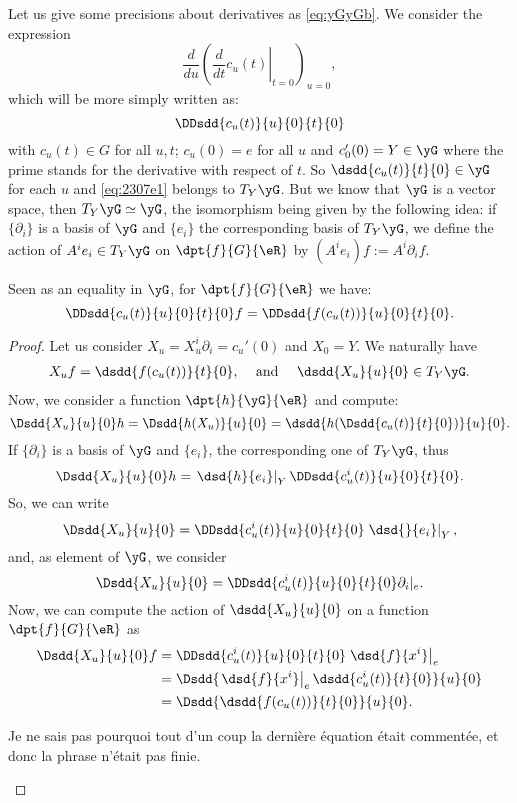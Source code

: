 Let us give some precisions about derivatives as \eqref{eq:yGyGb}. We consider the expression
\[
	\frac{d}{du}\left( \left.\frac{d}{dt} c_u(t)\right|_{t=0}\right)_{u=0},
\]
which will be more simply written as:
\begin{equation}\label{eq:2307e1}
	\DDsdd{ c_u(t) }{u}{0}{t}{0}
\end{equation}
with $c_u(t)\in G$ for all $u,t$; $c_u(0)=e$ for all $u$ and $c_0'(0)=Y\in\yG$ where the prime stands for the derivative with respect of $t$. So $\dsdd{c_u(t)}{t}{0}\in\yG$ for each $u$ and \eqref{eq:2307e1} belongs to $T_Y\yG$. But we know that $\yG$ is a vector space, then $T_Y\yG\simeq\yG$, the isomorphism being given by the following idea: if $\{\partial_i\}$ is a basis of $\yG$ and $\{e_i\}$ the corresponding basis of $T_Y\yG$, we define the action of $A^ie_i\in T_Y\yG$ on $\dpt{f}{G}{\eR}$ by $(A^ie_i)f:=A^i\partial_if$.

\begin{lemma}
	Seen as an equality in $\yG$, for $\dpt{f}{G}{\eR}$ we have:
	\begin{equation}
		\DDsdd{c_u(t)}{u}{0}{t}{0}f=\DDsdd{f(c_u(t))}{u}{0}{t}{0}.
	\end{equation}
\end{lemma}

\begin{proof}
	Let us consider $X_u=X_u^i\partial_i=c_u'(0)$ and $X_0=Y$. We naturally have
	\begin{align}
		X_uf & =\dsdd{f(c_u(t))}{t}{0}, & \text{ and } &  & \dsdd{X_u}{u}{0}\in T_Y\yG.
	\end{align}
	Now, we consider a function $\dpt{h}{\yG}{\eR}$ and compute:
	\[
		\Dsdd{X_u}{u}{0}h=\Dsdd{h(X_u)}{u}{0}
		=\dsdd{ h(\Dsdd{c_u(t)}{t}{0}) }{u}{0}.
	\]
	If $\{\partial_i\}$ is a basis of $\yG$ and $\{e_i\}$, the corresponding one of $T_Y\yG$, thus
	\begin{equation}
		\Dsdd{X_u}{u}{0}h=\left.\dsd{h}{e_i}\right|_Y\DDsdd{c^i_u(t)}{u}{0}{t}{0}.
	\end{equation}
	So, we can write
	\[
		\Dsdd{X_u}{u}{0}=\DDsdd{c^i_u(t)}{u}{0}{t}{0}\left.\dsd{}{e_i}\right|_Y,
	\]
	and, as element of $\yG$, we consider
	\[
		\Dsdd{X_u}{u}{0}=\DDsdd{ c^i_u(t) }{u}{0}{t}{0}\partial_i|_e.
	\]
	Now, we can compute the action of $\dsdd{X_u}{u}{0}$ on a function $\dpt{f}{G}{\eR}$ as
	\begin{equation}
		\begin{split}
			\Dsdd{X_u}{u}{0}f&=\DDsdd{c^i_u(t)}{u}{0}{t}{0}\left.\dsd{f}{x^i}\right|_e\\
			&=\Dsdd{ \left.\dsd{f}{x^i}\right|_e\dsdd{c^i_u(t)}{t}{0}  }{u}{0}\\
			&=\Dsdd{ \dsdd{f(c_u(t))}{t}{0} }{u}{0}.
		\end{split}
	\end{equation}
	\begin{probleme}
		Je ne sais pas pourquoi tout d'un coup la dernière équation était commentée, et donc la phrase n'était pas finie.
	\end{probleme}

\end{proof}

